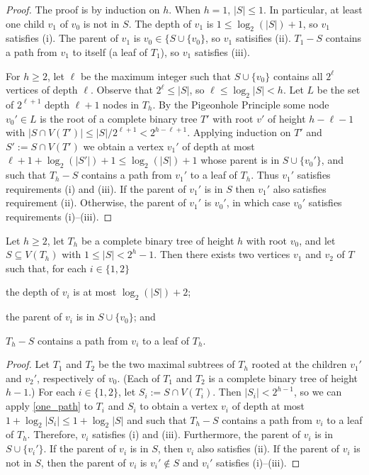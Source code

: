 \documentclass{patmorin}
\begin{document}
\begin{proof}
  The proof is by induction on $h$.  When $h=1$, $|S|\le 1$. In particular, at least one child $v_1$ of $v_0$ is not in $S$.  The depth of $v_1$ is $1\le \log_2(|S|)+1$, so $v_1$ satisfies (i).  The parent of $v_1$ is $v_0\in\{S\cup\{v_0\}$, so $v_1$ satisifies (ii).  $T_1-S$ contains a path from $v_1$ to itself (a leaf of $T_1$), so $v_1$ satisfies (iii).

  For $h\ge 2$, let $\ell$ be the maximum integer such that $S\cup\{v_0\}$ contains all $2^\ell$ vertices of depth $\ell$.  Observe that $2^\ell \le |S|$, so $\ell \le \log_2 |S| < h$.  Let $L$ be the set of $2^{\ell+1}$ depth $\ell+1$ nodes in $T_h$.  By the Pigeonhole Principle some node $v_0'\in L$ is the root of a complete binary tree $T'$ with root $v'$ of height $h-\ell-1$ with $|S\cap V(T')| \le |S|/2^{\ell+1} < 2^{h-\ell+1}$.  Applying induction on $T'$ and $S':=S\cap V(T')$ we obtain a vertex $v_1'$ of depth at most $\ell+1+\log_2(|S'|)+1 \le \log_2(|S|)+1$ whose parent is in $S\cup\{v_0'\}$, and such that $T_h-S$ contains a path from $v_1'$ to a leaf of $T_h$.  Thus $v_1'$ satisfies requirements (i) and (iii).  If the parent of $v_1'$ is in $S$ then $v_1'$ also satisfies requirement (ii).  Otherwise, the parent of $v_1'$ is $v_0'$, in which case $v_0'$ satisfies requirements (i)--(iii).
\end{proof}

\begin{lem}\label{two_paths}
  Let $h\ge 2$, let $T_h$ be a complete binary tree of height $h$ with root $v_0$, and let $S\subseteq V(T_h)$ with $1\le |S|< 2^h-1$. Then there exists two vertices $v_1$ and $v_2$ of $T$ such that, for each $i\in\{1,2\}$ 
  \begin{compactenum}[(i)]
    \item the depth of $v_i$ is at most $\log_2(|S|)+2$;
    \item the parent of $v_i$ is in $S\cup\{v_0\}$; and
    \item $T_h-S$ contains a path from $v_i$ to a leaf of $T_h$.
  \end{compactenum} 
\end{lem}

\begin{proof}
  Let $T_1$ and $T_2$ be the two maximal subtrees of $T_h$ rooted at the children $v_1'$ and $v_2'$, respectively of $v_0$. (Each of $T_1$ and $T_2$ is a complete binary tree of height $h-1$.)  For each $i\in\{1,2\}$, let $S_i:=S\cap V(T_i)$.  Then $|S_i|< 2^{h-1}$, so we can apply \cref{one_path} to $T_i$ and $S_i$ to obtain a vertex $v_i$ of depth at most $1+\log_2|S_i| \le 1+\log_2 |S|$ and such that $T_h-S$ contains a path from $v_i$ to a leaf of $T_h$.  Therefore, $v_i$ satisfies (i) and (iii).  Furthermore, the parent of $v_i$ is in $S\cup\{v_i'\}$.  If the parent of $v_i$ is in $S$, then $v_i$ also satisfies (ii).  If the parent of $v_i$ is not in $S$, then the parent of $v_i$ is $v_i'\not\in S$ and $v_i'$ satisfies (i)--(iii).
\end{proof}
\end{document}
